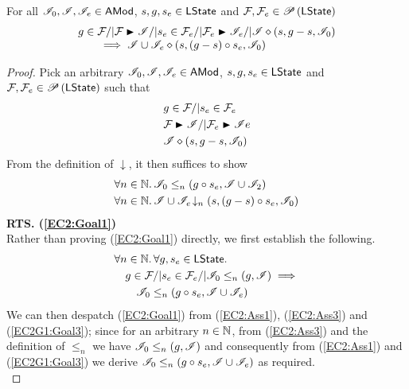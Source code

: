 \begin{lemma}\label{lem:extend-closure-2}
For all $\mathscr{I}_0, \mathscr{I}{}, \mathscr{I}_{e} \in \textsf{AMod}$, $s, g, s_e \in \textsf{LState}$ and $\mathcal{F}_{}, \mathcal{F}_{e} \in \mathscr{P}\left(\textsf{LState} \right)$
%
\[
\begin{array}{l}
	g \in \fence{} /| \fence{} \strictfences \lmod /|
	s_e \in \fence{e} /| \fence{e} \strictfences \lmod_{e} /|
	\extendsAM{\lmod}{s}{g-s}{\lmod_0}\\
	\qquad\implies
	\extendsAM{\lmod \cup \lmod_{e}}{s}{(g-s) \composeL s_e}{\lmod_{0}}
\end{array}
\]
%
\begin{proof} Pick an arbitrary $\mathscr{I}_0, \mathscr{I}, \mathscr{I}_e \in \textsf{AMod}$, $s, g, s_e \in \textsf{LState}$ and $\mathcal{F}_{}, \mathcal{F}_{e} \in \mathscr{P}\left(\textsf{LState} \right)$ such that 
%
\begin{align}
	& g \in \fence{} /| s_e \in \fence{e}  \label{EC2:Ass1}\\
	& \fence{} \strictfences \lmod /| \fence{e} \strictfences \lmod{e} \label{EC2:Ass2}\\
	& \extendsAM{\lmod}{s}{g-s}{\lmod_0} \label{EC2:Ass3}
\end{align} 
%
From the definition of $\downarrow$, it then suffices to show
%
\begin{align}
	& \forall n \in \mathbb{N}.\, \mathscr{I}_0 \leq_{n}\left(g \circ s_e, \mathscr{I} \cup \mathscr{I}_2\right) \label{EC2:Goal1}\\
	& \forall n \in \mathbb{N}.\, \mathscr{I} \cup \mathscr{I}_e \!\downarrow_{n} \left(s, (g-s) \circ s_e, \mathscr{I}_0\right) \label{EC2:Goal2}
\end{align}
%
\noindent\textbf{RTS. (\ref{EC2:Goal1})} \\
Rather than proving (\ref{EC2:Goal1}) directly, we first establish the following.
%
\begin{align}
	& \forall n \in \mathbb{N}.\, \forall g, s_e \in \textsf{LState}.\, \nonumber\\
	& \quad g \in \mathcal{F}_{} /|  s_e \in \mathcal{F}_{e} /| \mathscr{I}_0 \leq_{n}\left(g, \mathscr{I}\right) \implies \nonumber\\
	& \qquad \mathscr{I}_0 \leq_{n}\left(g \circ s_e, \mathscr{I} \cup \mathscr{I}_e\right) \label{EC2G1:Goal3}
\end{align}
%
We can then despatch (\ref{EC2:Goal1}) from (\ref{EC2:Ass1}), (\ref{EC2:Ass3}) and (\ref{EC2G1:Goal3}); since for an arbitrary $n \in \mathbb{N}$, from (\ref{EC2:Ass3}) and the definition of $\leq_n$ we have $\mathscr{I}_0 \leq_{n}\left(g, \mathscr{I}\right)$ and consequently from (\ref{EC2:Ass1}) and (\ref{EC2G1:Goal3}) we derive $\mathscr{I}_0 \leq_{n}\left(g \circ s_e, \mathscr{I} \cup \mathscr{I}_e\right) $ as required. \\


\end{proof}
\end{lemma}
